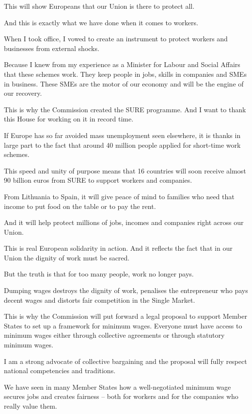 \documentclass[a4paper,11pt]{article}
\begin{document}
This will show Europeans that our Union is there to protect all.

And this is exactly what we have done when it comes to workers.

When I took office, I vowed to create an instrument to protect workers and businesses from external shocks.

Because I knew from my experience as a Minister for Labour and Social Affairs that these schemes work. They keep people in jobs, skills in companies and SMEs in business. These SMEs are the motor of our economy and will be the engine of our recovery.

This is why the Commission created the SURE programme. And I want to thank this House for working on it in record time.

If Europe has so far avoided mass unemployment seen elsewhere, it is thanks in large part to the fact that around 40 million people applied for short-time work schemes.

This speed and unity of purpose means that 16 countries will soon receive almost 90 billion euros from SURE to support workers and companies.

From Lithuania to Spain, it will give peace of mind to families who need that income to put food on the table or to pay the rent.

And it will help protect millions of jobs, incomes and companies right across our Union.

This is real European solidarity in action. And it reflects the fact that in our Union the dignity of work must be sacred.

But the truth is that for too many people, work no longer pays.

Dumping wages destroys the dignity of work, penalises the entrepreneur who pays decent wages and distorts fair competition in the Single Market.

This is why the Commission will put forward a legal proposal to support Member States to set up a framework for minimum wages. Everyone must have access to minimum wages either through collective agreements or through statutory minimum wages.

I am a strong advocate of collective bargaining and the proposal will fully respect national competencies and traditions.

We have seen in many Member States how a well-negotiated minimum wage secures jobs and creates fairness – both for workers and for the companies who really value them.
\end{document}
